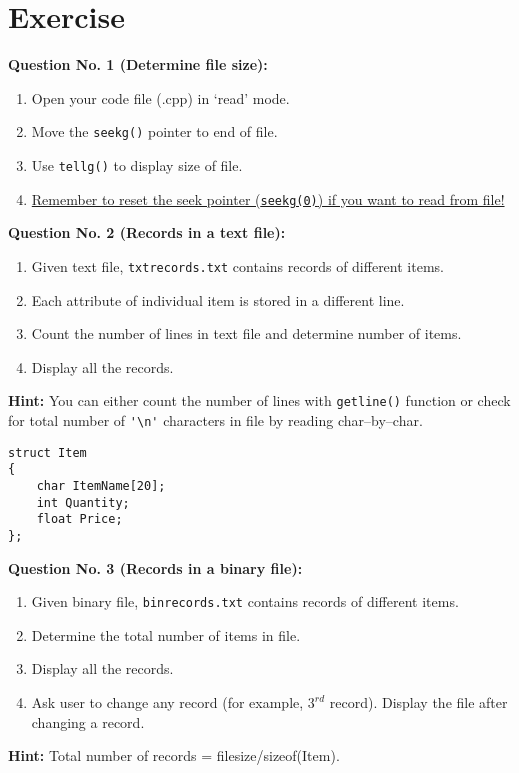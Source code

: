 \documentclass[12pt,a4paper]{article}
\begin{document}
\section{Exercise}
\noindent\textbf{Question No. 1 (Determine file size):}\\
\vspace{-0.5cm}\begin{enumerate}
\item Open your code file (.cpp) in `read' mode.
\item Move the \verb|seekg()| pointer to end of file.
\item Use \verb|tellg()| to display size of file.
\item \underline{Remember to reset the seek pointer (\texttt{seekg(0)}) if you want to read from file!}
\end{enumerate}
\noindent\textbf{Question No. 2 (Records in a text file):}\\
\vspace{-0.5cm}\begin{enumerate}
\item Given text file, \verb|txtrecords.txt| contains records of different items.
\item Each attribute of individual item is stored in a different line.
\item Count the number of lines in text file and determine number of items.
\item Display all the records.
\end{enumerate}
\noindent\textbf{Hint:} You can either count the number of lines with \verb|getline()| function or check for total number of \verb|'\n'| characters in file by reading char--by--char.
\begin{lstlisting}
struct Item
{
	char ItemName[20];
	int Quantity;
	float Price;
};
\end{lstlisting}
\noindent\textbf{Question No. 3 (Records in a binary file):}\\
\vspace{-0.5cm}\begin{enumerate}
\item Given binary file, \verb|binrecords.txt| contains records of different items.
\item Determine the total number of items in file.
\item Display all the records.
\item Ask user to change any record (for example, $3^{rd}$ record). Display the file after changing a record.
\end{enumerate}
\noindent\textbf{Hint:} Total number of records = filesize/sizeof(Item).
\end{document}
